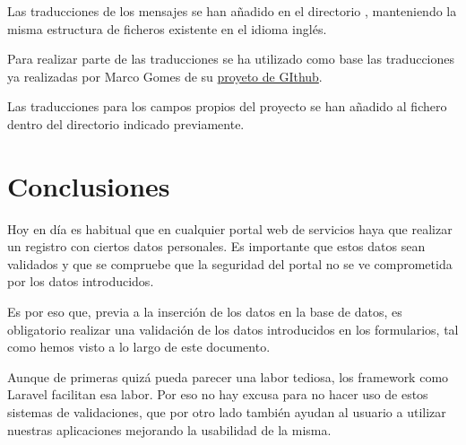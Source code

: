 \documentclass{\ClassPath/viu-tfm-template}
\begin{document}
Las traducciones de los mensajes se han añadido en el directorio , manteniendo la misma estructura de ficheros existente en el idioma inglés.

Para realizar parte de las traducciones se ha utilizado como base las traducciones ya realizadas por Marco Gomes de su \href{https://github.com/MarcoGomesr/laravel-validation-en-espanol}{proyeto de GIthub}.

Las traducciones para los campos propios del proyecto se han añadido al fichero  dentro del directorio indicado previamente.



\chapter{Conclusiones}
Hoy en día es habitual que en cualquier portal web de servicios haya que realizar un registro con ciertos datos personales. Es importante que estos datos sean validados y que se compruebe que la seguridad del portal no se ve comprometida por los datos introducidos.

Es por eso que, previa a la inserción de los datos en la base de datos, es obligatorio realizar una validación de los datos introducidos en los formularios, tal como hemos visto a lo largo de este documento.

Aunque de primeras quizá pueda parecer una labor tediosa, los framework como Laravel facilitan esa labor. Por eso no hay excusa para no hacer uso de estos sistemas de validaciones, que por otro lado también ayudan al usuario a utilizar nuestras aplicaciones mejorando la usabilidad de la misma.
\end{document}
